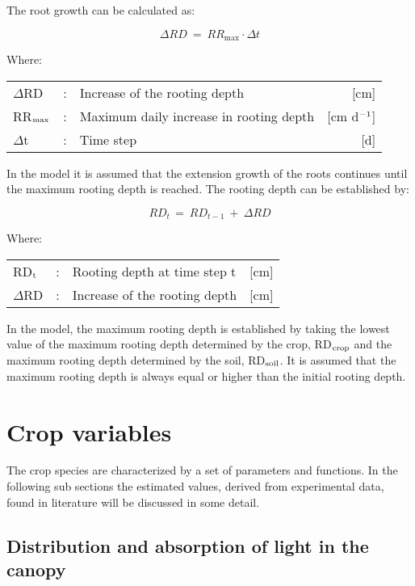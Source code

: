 The root growth can be calculated as:

\begin{equation}
\Delta RD~=~RR_{\max} \cdot \Delta t
\end{equation}

Where:\\[5pt]
\begin{tabularx}{\textwidth}{llXr}
	$\Delta$RD &:& Increase of the rooting depth   &   [cm]\\
	RR$_{{\rm max}}$ &:& Maximum daily increase in rooting depth  &  [cm d$^{{\rm -}{1}}$]\\
	$\Delta$t &:& Time step   &  [d]\\
\end{tabularx}

In the model it is assumed that the extension growth of the roots continues until the
maximum rooting depth is reached. The rooting depth can be established by:

\begin{equation}
RD _{t~} =~RD _{t-1} ~+~\Delta RD
\end{equation}

Where:\\[5pt]
\begin{tabularx}{\textwidth}{llXr}
	RD$_{{\rm t}}$ &:& Rooting depth at time step t   &  [cm]\\
	$\Delta$RD &:& Increase of the rooting depth    & [cm]\\
\end{tabularx}

In the model, the maximum rooting depth is established by taking the lowest value of the
maximum rooting depth determined by the crop, RD$_{{\rm crop}}$ and the maximum rooting depth
determined by the soil, RD$_{{\rm soil}}$. It is assumed that the maximum rooting depth is 
always equal or higher than the initial rooting depth.


\section{Crop variables}

The crop species are characterized by a set of parameters and functions. In the following
sub sections the estimated values, derived from experimental data, found in literature will
be discussed in some detail.

\subsection{Distribution and absorption of light in the canopy} 


